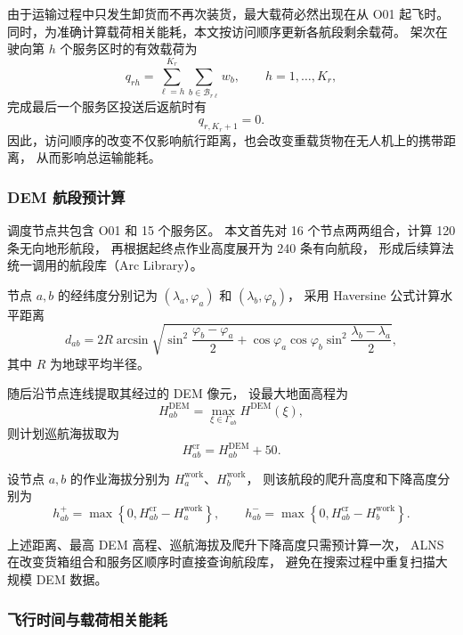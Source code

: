 由于运输过程中只发生卸货而不再次装货，最大载荷必然出现在从 O01 起飞时。
同时，为准确计算载荷相关能耗，本文按访问顺序更新各航段剩余载荷。
架次在驶向第 $h$ 个服务区时的有效载荷为
\begin{equation}
	q_{rh}
	=
	\sum_{\ell=h}^{K_r}
	\sum_{b\in\mathcal{B}_{r\ell}}w_b,
	\qquad
	h=1,\ldots,K_r,
	\label{eq:q2-suffix-load}
\end{equation}
完成最后一个服务区投送后返航时有
\[
q_{r,K_r+1}=0.
\]
因此，访问顺序的改变不仅影响航行距离，也会改变重载货物在无人机上的携带距离，
从而影响总运输能耗。

\subsubsection{DEM 航段预计算}

调度节点共包含 O01 和 15 个服务区。
本文首先对 16 个节点两两组合，计算 120 条无向地形航段，
再根据起终点作业高度展开为 240 条有向航段，
形成后续算法统一调用的航段库（Arc Library）。

节点 $a,b$ 的经纬度分别记为
$(\lambda_a,\varphi_a)$ 和 $(\lambda_b,\varphi_b)$，
采用 Haversine 公式计算水平距离
\begin{equation}
	d_{ab}
	=
	2R\arcsin
	\sqrt{
		\sin^2\frac{\varphi_b-\varphi_a}{2}
		+
		\cos\varphi_a\cos\varphi_b
		\sin^2\frac{\lambda_b-\lambda_a}{2}
	},
	\label{eq:q2-haversine}
\end{equation}
其中 $R$ 为地球平均半径。

随后沿节点连线提取其经过的 DEM 像元，
设最大地面高程为
\[
H_{ab}^{\mathrm{DEM}}
=
\max_{\xi\in\Gamma_{ab}}H^{\mathrm{DEM}}(\xi),
\]
则计划巡航海拔取为
\begin{equation}
	H_{ab}^{\mathrm{cr}}
	=
	H_{ab}^{\mathrm{DEM}}+50.
	\label{eq:q2-cruise-alt}
\end{equation}

设节点 $a,b$ 的作业海拔分别为
$H_a^{\mathrm{work}}$、$H_b^{\mathrm{work}}$，
则该航段的爬升高度和下降高度分别为
\begin{equation}
	h_{ab}^{+}
	=
	\max\left\{0,H_{ab}^{\mathrm{cr}}-H_a^{\mathrm{work}}\right\},
	\qquad
	h_{ab}^{-}
	=
	\max\left\{0,H_{ab}^{\mathrm{cr}}-H_b^{\mathrm{work}}\right\}.
	\label{eq:q2-climb-descent}
\end{equation}

上述距离、最高 DEM 高程、巡航海拔及爬升下降高度只需预计算一次，
ALNS 在改变货箱组合和服务区顺序时直接查询航段库，
避免在搜索过程中重复扫描大规模 DEM 数据。

\subsubsection{飞行时间与载荷相关能耗}

